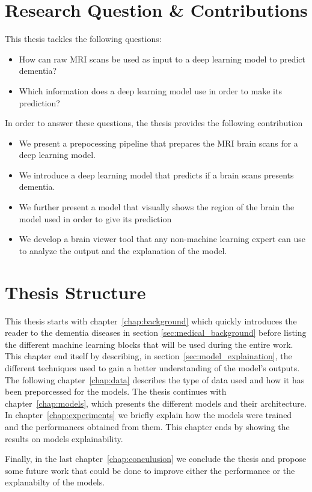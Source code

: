 \section{Research Question & Contributions}
This thesis tackles the following questions:
\begin{itemize}
    \item How can raw MRI scans be used as input to a deep learning model to predict dementia?
    \item Which information does a deep learning model use in order to make its prediction? 
\end{itemize}

In order to answer these questions, the thesis provides the following contribution
\begin{itemize}
    \item We present a prepocessing pipeline that prepares the MRI brain scans for a deep learning model.
    \item We introduce a deep learning model that predicts if a brain scans presents dementia.
    \item We further present a model that visually shows the region of the brain the model used in order to give its prediction
    \item We develop a brain viewer tool that any non-machine learning expert can use to analyze the output and the explanation of the model.
\end{itemize}



\section{Thesis Structure}
\label{sec:structure}
This thesis starts with chapter~\ref{chap:background} which quickly introduces the reader to the dementia diseases in section \ref{sec:medical_background} before listing the different machine learning blocks that will be used during the entire work. This chapter end itself by describing, in section~\ref{sec:model_explaination}, the different techniques used to gain a better understanding of the model's outputs. The following chapter~\ref{chap:data} describes the type of data used and how it has been preporcessed for the models. The thesis continues with chapter~\ref{chap:models}, which presents the different models and their architecture. 
In chapter~\ref{chap:experiments} we briefly explain how the models were trained and the performances obtained from them. This chapter ends by showing the results on models explainability.

Finally, in the last chapter~\ref{chap:conculusion} we conclude the thesis and propose some future work that could be done to improve either the performance or the explanabilty of the models.
